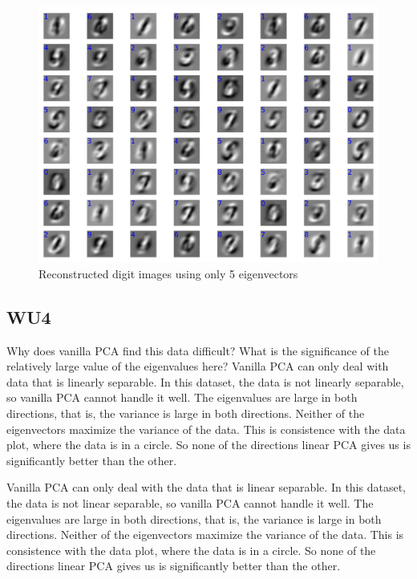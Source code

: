 \documentclass[a4paper,11pt]{article}
\begin{document}
\begin{figure}[!ht]
  \begin{center}
  \includegraphics[width=4.5in]{WU3_c.pdf}
  \caption{Reconstructed digit images using only 5 eigenvectors}
  \label{figures:WU3c}
  \end{center}
\end{figure}

\subsection{WU4}
\textsf{Why does vanilla PCA find this data difficult? What is the
significance of the relatively large value of the eigenvalues
here?}\vspace{0.1in}
Vanilla PCA can only deal with data that is linearly separable. In this dataset, the data is not linearly separable, so vanilla PCA cannot handle it well. 
The eigenvalues are large in both directions, that is, the variance is large in both directions. Neither of the eigenvectors maximize the variance of the data. This is consistence with the data plot, where the data is in a circle. So none of the directions linear PCA gives us is significantly better than the other.  

Vanilla PCA can only deal with the data that is linear separable. In this
dataset, the data is not linear separable, so vanilla PCA cannot handle it
well.
The eigenvalues are large in both directions, that is, the variance is large
in both directions. Neither of the eigenvectors maximize the variance of the
data. This is consistence with the data plot, where the data is in a circle.
So none of the directions linear PCA gives us is significantly better than
the other.
\end{document}
